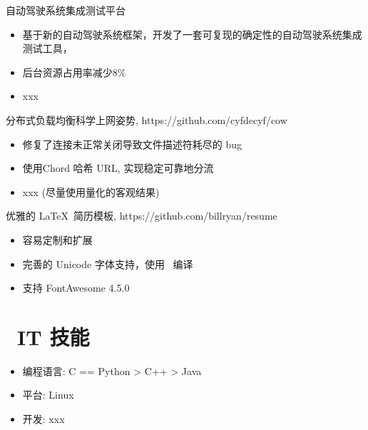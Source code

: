\documentclass{resume}
\begin{document}
自动驾驶系统集成测试平台
\begin{itemize}
  \item 基于新的自动驾驶系统框架，开发了一套可复现的确定性的自动驾驶系统集成测试工具，
  \item 后台资源占用率减少8\%
  \item xxx
\end{itemize}
\begin{onehalfspacing}
分布式负载均衡科学上网姿势, https://github.com/cyfdecyf/cow
\begin{itemize}
  \item 修复了连接未正常关闭导致文件描述符耗尽的 bug
  \item 使用Chord 哈希 URL, 实现稳定可靠地分流
  \item xxx (尽量使用量化的客观结果)
\end{itemize}
\end{onehalfspacing}

\begin{onehalfspacing}
优雅的 \LaTeX\ 简历模板, https://github.com/billryan/resume
\begin{itemize}
  \item 容易定制和扩展
  \item 完善的 Unicode 字体支持，使用 \XeLaTeX\ 编译
  \item 支持 FontAwesome 4.5.0
\end{itemize}
\end{onehalfspacing}


\section{\faCogs\ IT 技能}
\begin{itemize}[parsep=0.5ex]
  \item 编程语言: C == Python > C++ > Java
  \item 平台: Linux
  \item 开发: xxx
\end{itemize}
\end{document}
